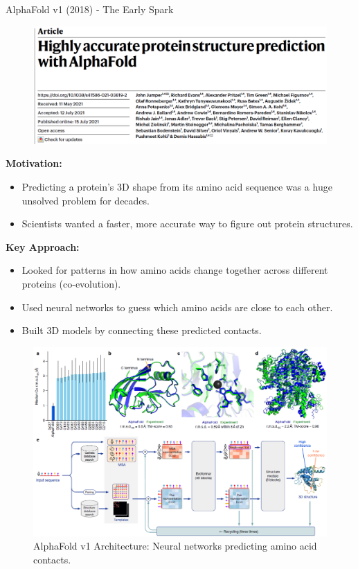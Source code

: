 \begin{frame}[allowframebreaks]{AlphaFold v1 (2018) - The Early Spark}
    \begin{figure}
        \centering
        \includegraphics[width=\linewidth,height=0.9\textheight,keepaspectratio]{images/science/alphafold-1-paper.png}
    \end{figure}

    \framebreak
    
    \textbf{Motivation:}
    \begin{itemize}
        \item Predicting a protein's 3D shape from its amino acid sequence was a huge unsolved problem for decades.
        \item Scientists wanted a faster, more accurate way to figure out protein structures.
    \end{itemize}

    \textbf{Key Approach:}
    \begin{itemize}
        \item Looked for patterns in how amino acids change together across different proteins (co-evolution).
        \item Used neural networks to guess which amino acids are close to each other.
        \item Built 3D models by connecting these predicted contacts.
    \end{itemize}

    \framebreak

    \begin{figure}
        \centering
        \includegraphics[width=\linewidth,height=0.85\textheight,keepaspectratio]{images/science/alphafold-1-architecture.png}
        \caption*{AlphaFold v1 Architecture: Neural networks predicting amino acid contacts.}
    \end{figure}
    

\end{frame}
